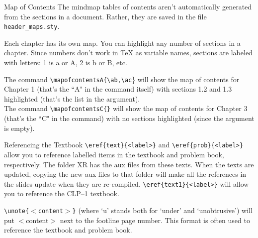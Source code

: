 \documentclass[10pt]{beamer}
\begin{document}
\begin{frame}[t]{Map of Contents}
The mindmap tables of contents aren't automatically generated from the sections in a document. Rather, they are saved in the file \texttt{header\_maps.sty}.\vfill

Each chapter has its own map. You can highlight any number of sections in a chapter. Since numbers don't work in TeX as variable names, sections are labeled with letters: 1 is a or A, 2 is b or B, etc. 
\vfill

The command \texttt{\textbackslash mapofcontentsA\{\textbackslash ab,\textbackslash ac}\} will show the map of contents for Chapter 1 (that's the ``A" in the command itself) with sections 1.2 and 1.3 highlighted (that's the list in the argument). \\

The command \texttt{\textbackslash mapofcontentsC\{\}} will show the map of contents for Chapter 3 (that's the ``C" in the command) with no sections highlighted (since the argument is empty).\\

\end{frame}

\begin{frame}[fragile]{Referencing the Textbook}
\verb|\eref{text}{<label>}| and \verb|\eref{prob}{<label>}| allow you to reference labelled items in the textbook and problem book, respectively. The folder XR has the aux files from these texts. When the texts are updated, copying the new aux files to that folder will make all the references in the slides update when they are re-compiled.
\vfill
\verb|\eref{text1}{<label>}| will allow you to reference the CLP--1 textbook.
\vfill

\texttt{\textbackslash unote\{$<$content$>$\}} (where `u' stands both for `under' and `unobtrusive') will put $<$content$>$ next to the footline page number. This format is often used to reference the textbook and problem book.
\end{frame}
\end{document}
